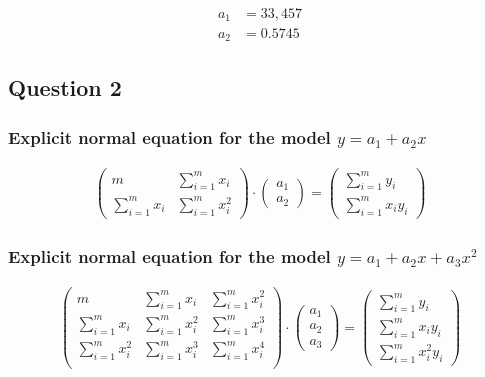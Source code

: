 \begin{equation}
	\begin{aligned}    
		a_1 &= 33,457\\
		a_2 &= 0.5745
	\end{aligned}
\end{equation}

\subsection{Question 2}

\subsubsection{Explicit normal equation for the model $y = a_1 + a_2x$}

\begin{equation}
	\begin{aligned}
		\begin{pmatrix}
			m & \displaystyle\sum_{i=1}^{m} x_i\\
			\displaystyle\sum_{i=1}^{m} x_i & \displaystyle\sum_{i=1}^{m} x_i^2
		\end{pmatrix}
		\cdot
		\begin{pmatrix}
			a_1\\
			a_2
		\end{pmatrix}=
		\begin{pmatrix}
			\displaystyle\sum_{i=1}^{m} y_i\\
			\displaystyle\sum_{i=1}^{m} x_iy_i
		\end{pmatrix}
	\end{aligned}
\end{equation}

\subsubsection{Explicit normal equation for the model $y = a_1 + a_2x + a_3x^2$}

\begin{equation}
	\begin{aligned}
		\begin{pmatrix}
			m & \displaystyle\sum_{i=1}^{m} x_i & \displaystyle\sum_{i=1}^{m} x_i^2\\
			\displaystyle\sum_{i=1}^{m} x_i & \displaystyle\sum_{i=1}^{m} x_i^2 & \displaystyle\sum_{i=1}^{m} x_i^3\\
			\displaystyle\sum_{i=1}^{m} x_i^2 & \displaystyle\sum_{i=1}^{m} x_i^3 & \displaystyle\sum_{i=1}^{m} x_i^4\\
		\end{pmatrix}
		\cdot
		\begin{pmatrix}
			a_1\\
			a_2\\
			a_3
		\end{pmatrix}=
		\begin{pmatrix}
			\displaystyle\sum_{i=1}^{m} y_i\\
			\displaystyle\sum_{i=1}^{m} x_iy_i\\
			\displaystyle\sum_{i=1}^{m} x_i^2y_i
		\end{pmatrix}
	\end{aligned}
\end{equation}


